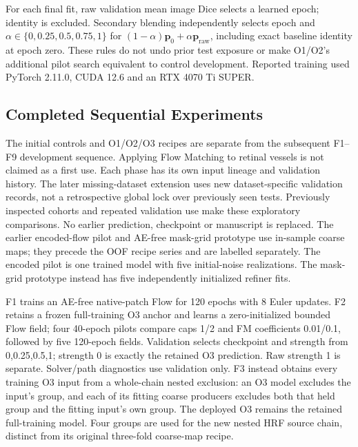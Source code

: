 \documentclass[jimaging,article,submit,pdftex,moreauthors]{Definitions/mdpi}
\begin{document}
For each final fit, raw validation mean image Dice selects a learned epoch;
identity is excluded. Secondary blending independently selects epoch and
$\alpha\in\{0,0.25,0.5,0.75,1\}$ for
$(1-\alpha)\mathbf{p}_0+\alpha\mathbf{p}_{\mathrm{raw}}$, including exact
baseline identity at epoch zero. These rules do not undo prior test exposure
or make O1/O2's additional pilot search equivalent to control development.
Reported training used PyTorch 2.11.0, CUDA 12.6 and an RTX 4070 Ti SUPER.


\subsection{Completed Sequential Experiments}\label{sec:sequential-methods}
The initial controls and O1/O2/O3 recipes are separate from the subsequent
F1--F9 development sequence. Applying Flow Matching to retinal vessels is not
claimed as a first use. Each phase has its own input lineage and validation
history. The later missing-dataset extension uses new dataset-specific
validation records, not a retrospective global lock over previously seen tests.
Previously inspected cohorts and repeated validation use make these exploratory
comparisons. No earlier prediction, checkpoint or manuscript is replaced.
The earlier encoded-flow pilot and AE-free mask-grid prototype use in-sample
coarse maps; they precede the OOF recipe series and are labelled separately.
The encoded pilot is one trained model with five initial-noise realizations.
The mask-grid prototype instead has five independently initialized refiner fits.

F1 trains an AE-free native-patch Flow for 120 epochs with 8 Euler updates.
F2 retains a frozen full-training O3 anchor and learns a zero-initialized bounded
Flow field; four 40-epoch pilots compare caps 1/2 and FM coefficients 0.01/0.1,
followed by five 120-epoch fields. Validation selects checkpoint and strength
from 0,0.25,0.5,1; strength 0 is exactly the retained O3 prediction. Raw strength 1
is separate. Solver/path diagnostics use validation only. F3 instead obtains
every training O3 input from a whole-chain nested exclusion: an O3 model
excludes the input's group, and each of its fitting coarse producers excludes
both that held group and the fitting input's own group. The deployed O3 remains
the retained full-training model. Four groups are used for the new nested
HRF source chain, distinct from its original three-fold coarse-map recipe.
\end{document}

